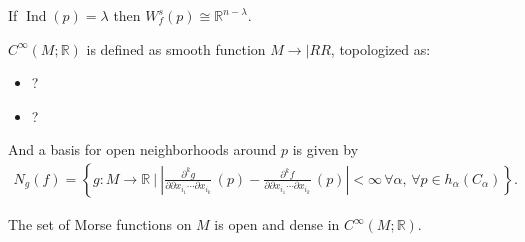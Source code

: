 \begin{lemma}[?]

If \(\mathop{\mathrm{Ind}}(p) = \lambda\) then
\(W_f^s(p) \cong {\mathbb{R}}^{n- \lambda}\).

\end{lemma}

\begin{definition}[$C^\infty$ ]

\(C^ \infty (M; {\mathbb{R}})\) is defined as smooth function
\(M\to |RR\), topologized as:

\begin{itemize}
\tightlist
\item
  ?
\item
  ?
\end{itemize}

And a basis for open neighborhoods around \(p\) is given by
\begin{align*}
N_g(f) = \left\{{
g:M\to {\mathbb{R}}{~\mathrel{\Big|}~}
{\left\lvert {
{\frac{\partial ^k g}{\partial {\partial}x _{i_1} \cdots {\partial}x _{i_k} }\,}(p)
- 
{\frac{\partial ^k f}{\partial {\partial}x _{i_1} \cdots {\partial}x _{i_k} }\,}(p)
} \right\rvert} < \infty\, \forall \alpha,\, \forall p\in h_ \alpha(C_ \alpha)
}\right\}
.\end{align*}

\end{definition}

\begin{theorem}[?]

The set of Morse functions on \(M\) is open and dense in
\(C^ \infty (M; {\mathbb{R}})\).

\end{theorem}

\cleardoublepage

\renewcommand{\listtheoremname}{}
\listoftheorems[ignoreall,show={definition}, numwidth=3.5em]
\cleardoublepage

\renewcommand{\listtheoremname}{}
\listoftheorems[ignoreall,show={theorem,proposition}, numwidth=3.5em]
\cleardoublepage

\renewcommand{\listtheoremname}{}
\listoftheorems[ignoreall,show={exercise}, numwidth=3.5em]
\cleardoublepage

\listoffigures
\cleardoublepage


\printbibliography[title=Bibliography]



